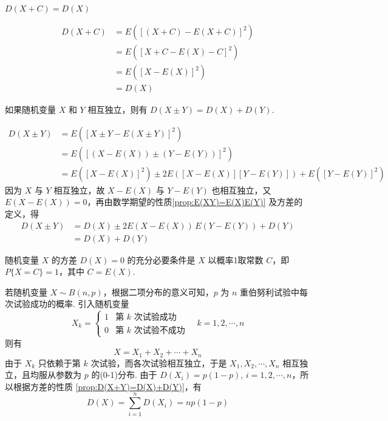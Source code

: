 \begin{property}
    $D(X+C) = D(X)$
\end{property}

\begin{myproof}
    $$
    \begin{aligned}
        D(X+C) &= E([(X+C) - E(X+C)]^2) \\
        &= E([X + C - E(X) - C]^2) \\
        &= E([X-E(X)]^2) \\
        &= D(X)
    \end{aligned}
    $$
\end{myproof}

\begin{property} \label{prop:D(X+Y)=D(X)+D(Y)}
    如果随机变量 $X$ 和 $Y$ 相互独立，则有 $D(X \pm Y) = D(X)+D(Y)$.
\end{property}

\begin{myproof}
    $$
    \begin{aligned}
        D(X \pm Y) &= E([X \pm Y - E(X \pm Y)]^2) \\
        &= E([(X-E(X)) \pm (Y-E(Y))]^2) \\
        &= E([X-E(X)]^2) \pm 2E([X-E(X)][Y-E(Y)]) + E([Y-E(Y)]^2)
    \end{aligned}
    $$
    因为 $X$ 与 $Y$ 相互独立，故 $X-E(X)$ 与 $Y-E(Y)$ 也相互独立，又 $E(X-E(X)) = 0$，再由数学期望的性质\ref*{prop:E(XY)=E(X)E(Y)} 及方差的定义，得
    $$
    \begin{aligned}
        D(X \pm Y) &= D(X) \pm 2E(X-E(X)) \, E(Y-E(Y)) + D(Y) \\
        &= D(X) + D(Y)
    \end{aligned}
    $$
\end{myproof}

\begin{property} \label{prop:D(X)=0}
    随机变量 $X$ 的方差 $D(X)=0$ 的充分必要条件是 $X$ 以概率1取常数 $C$，即 $P\{X=C\}=1$，其中 $C=E(X)$.
\end{property}

若随机变量 $X \sim B(n,p)$，根据二项分布的意义可知，$p$ 为 $n$ 重伯努利试验中每次试验成功的概率. 引入随机变量
$$
X_k = \begin{cases}
    1 & \text{第 $k$ 次试验成功} \\
    0 & \text{第 $k$ 次试验不成功}
\end{cases} \quad k=1,2,\cdots,n
$$
则有
$$
X = X_1 + X_2 + \cdots + X_n
$$
由于 $X_k$ 只依赖于第 $k$ 次试验，而各次试验相互独立，于是 $X_1, X_2, \cdots, X_n$ 相互独立，且均服从参数为 $p$ 的(0-1)分布. 由于 $D(X_i) = p(1-p), \, i=1,2,\cdots,n$，所以根据方差的性质 \ref*{prop:D(X+Y)=D(X)+D(Y)}，有
$$
D(X) = \sum_{i=1}^n D(X_i) = np(1-p)
$$

